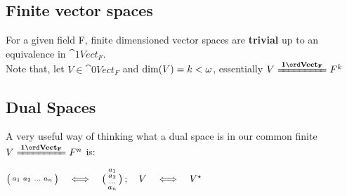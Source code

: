 \subsection{Finite vector spaces}
For a given field F, finite dimensioned vector spaces are \textbf{trivial} up to an equivalence in \(\cat{1}{Vect_F}\). \\
Note that, let \( V \in \cat{0}{Vect_F} \) and \(\operatorname{dim}(V)=k<\omega \), essentially \(V \iso{Vect_F} F^k \)

\subsection{Dual Spaces}
A very useful way of thinking what a dual space is in our common finite \(V\iso{Vect_F} F^n\) is:
\begin{lemma}
  \(\big(\begin{smallmatrix}
    a_1 & a_2 & \ldots & a_n 
  \end{smallmatrix}\big) \quad \Longleftrightarrow \quad \big(\begin{smallmatrix}
                                         a_1\\
                                         a_2\\
                                         \ldots\\
                                         a_n
                                       \end{smallmatrix}\big)\, ; \quad V \quad \Longleftrightarrow \quad V^{\star}\)
\end{lemma}